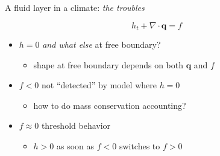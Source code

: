 \documentclass{beamer}
\newcommand\bq{\mathbf{q}}
\newcommand{\Div}{\nabla\cdot}
\begin{document}
\begin{frame}{A fluid layer in a climate: \emph{the troubles}}

\vspace{-1.2mm}

\begin{center}
\end{center}

\vspace{-18mm}
$$h_t + \Div\bq = f$$

  \begin{itemize}
  \item<1-> $h=0$ \emph{and what else} at free boundary?
     \begin{itemize}
     \item<1->[$\circ$] shape at free boundary depends on both $\bq$ and $f$
     \end{itemize}
  \item<2-> $f<0$ not ``detected'' by model where $h=0$
     \begin{itemize}
     \item<2->[$\circ$] how to do mass conservation accounting?
     \end{itemize}
  \item<3> $f\approx 0$ threshold behavior
     \begin{itemize}
     \item<3>[$\circ$] $h>0$ as soon as $f<0$ switches to $f>0$
     \end{itemize}
  \end{itemize}
\end{frame}
\end{document}
